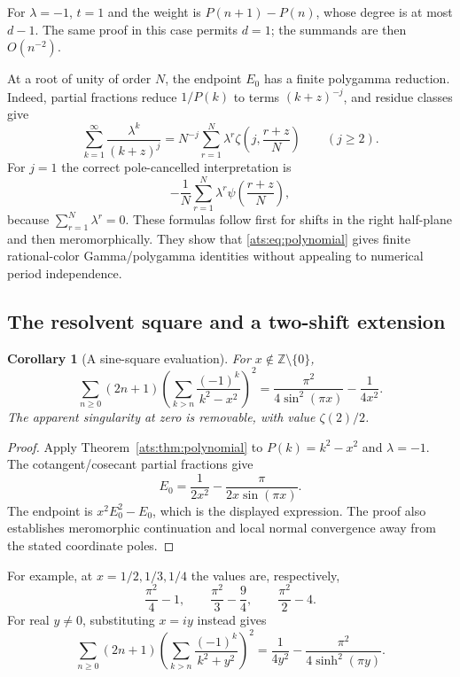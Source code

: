 \documentclass[11pt,a4paper]{article}
\numberwithin{equation}{section}
\newtheorem{corollary}[theorem]{Corollary}
\theoremstyle{definition}
\theoremstyle{remark}
\begin{document}
For $\lambda=-1$, $t=1$ and the weight is $P(n+1)-P(n)$, whose
degree is at most $d-1$. The same proof in this case permits $d=1$;
the summands are then $O(n^{-2})$.

At a root of unity of order $N$, the endpoint $E_0$ has a finite
polygamma reduction. Indeed, partial fractions reduce $1/P(k)$ to
terms $(k+z)^{-j}$, and residue classes give
\[
 \sum_{k=1}^{\infty}\frac{\lambda^k}{(k+z)^j}
 =N^{-j}\sum_{r=1}^{N}\lambda^r
                   \zeta\!\left(j,\frac{r+z}{N}\right)
 \qquad(j\ge2).
\]
For $j=1$ the correct pole-cancelled interpretation is
\[
 -\frac1N\sum_{r=1}^{N}\lambda^r
                         \psi\!\left(\frac{r+z}{N}\right),
\]
because $\sum_{r=1}^{N}\lambda^r=0$. These formulas follow first
for shifts in the right half-plane and then meromorphically. They
show that \eqref{ats:eq:polynomial} gives finite rational-color
Gamma/polygamma identities without appealing to numerical period
independence.

\subsection{The resolvent square and a two-shift extension}

\begin{corollary}[A sine-square evaluation]
\label{ats:cor:resolvent}
For $x\notin\mathbb Z\setminus\{0\}$,
\begin{equation}\label{ats:eq:resolvent}
 \boxed{\displaystyle
 \sum_{n\ge0}(2n+1)
   \left(\sum_{k>n}\frac{(-1)^k}{k^2-x^2}\right)^2
 =\frac{\pi^2}{4\sin^2(\pi x)}-\frac1{4x^2}.}
\end{equation}
The apparent singularity at zero is removable, with value
$\zeta(2)/2$.
\end{corollary}

\begin{proof}
Apply Theorem~\ref{ats:thm:polynomial} to $P(k)=k^2-x^2$ and
$\lambda=-1$. The cotangent/cosecant partial fractions give
\[
 E_0=\frac1{2x^2}-\frac{\pi}{2x\sin(\pi x)}.
\]
The endpoint is $x^2E_0^2-E_0$, which is the displayed expression.
The proof also establishes meromorphic continuation and local normal
convergence away from the stated coordinate poles.
\end{proof}

For example, at $x=1/2,1/3,1/4$ the values are, respectively,
\[
 \frac{\pi^2}{4}-1,\qquad
 \frac{\pi^2}{3}-\frac94,\qquad
 \frac{\pi^2}{2}-4.
\]
For real $y\ne0$, substituting $x=iy$ instead gives
\[
 \sum_{n\ge0}(2n+1)
   \left(\sum_{k>n}\frac{(-1)^k}{k^2+y^2}\right)^2
 =\frac1{4y^2}-\frac{\pi^2}{4\sinh^2(\pi y)}.
\]
\end{document}
